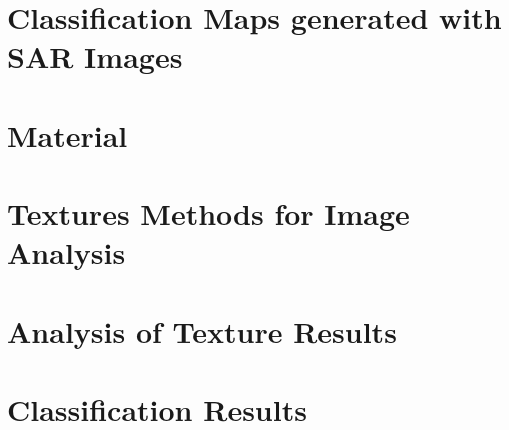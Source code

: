 \documentclass[msc, eng]{ita}    %
\begin{document}
\chapter{Classification Maps generated with SAR Images}
\label{cap:requisitos}


\chapter{Material}
\label{cap:material rondonia}


\chapter{Textures Methods for Image Analysis}
\label{cap:texture_methods}


\chapter{Analysis of Texture Results}
\label{cap:analysis_texture_results}


\chapter{Classification Results}
\label{cap:classification_results}


% 

% 


\renewcommand\bibname{\itareferencesnamebabel} %


%

%
\end{document}

